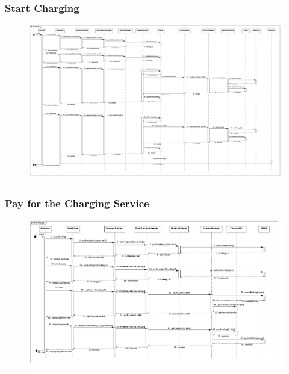 \subsubsection{Start Charging}
\begin{figure}[H]
    \begin{center}
        \includegraphics[width=\textwidth]{img/runtime/start_charge}
    \end{center}
\end{figure}

\subsubsection{Pay for the Charging Service}
\begin{figure}[H]
    \begin{center}
        \includegraphics[width=\textwidth]{img/runtime/pay_charging}
    \end{center}
\end{figure}
